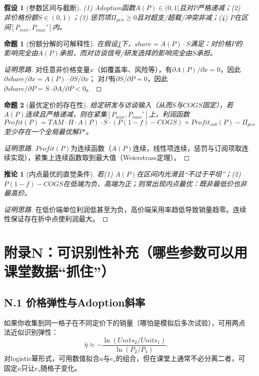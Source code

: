 \documentclass[UTF8,12pt]{ctexart}
\newtheorem{proposition}{命题}
\newtheorem{corollary}{推论}
\newtheorem{assumption}{假设}
\begin{document}
\begin{assumption}[参数区间与截断]\label{ass:param}
(1) Adoption函数$A(P)\in(0,1]$且对$P$严格递减；(2) 非价格份额$S\in(0,1)$；(3) 惩罚项$\Pi_{pen}\ge 0$且对超支/超载/冲突非减；(4) $P$在区间$[P_{min},P_{max}']$内。
\end{assumption}

\begin{proposition}[份额分解的可解释性]\label{prop:decomp}
在假设\ref{ass:param}下，$share=A(P)\cdot S$满足：对价格$P$的影响完全由$A(P)$承担，而对访谈信号/研发选择的影响完全由$S$承担。
\end{proposition}
\begin{proof}[证明思路]
对任意非价格变量$x$（如覆盖率、风险等），有$\partial A(P)/\partial x=0$，因此
$\partial share/\partial x=A(P)\cdot \partial S/\partial x$；
对$P$有$\partial S/\partial P=0$，因此$\partial share/\partial P=S\cdot \partial A/\partial P<0$。
\end{proof}

\begin{proposition}[最优定价的存在性]\label{prop:exist}
给定研发与访谈输入（从而$S$与$COGS$固定），若$A(P)$连续且严格递减，则在紧集$[P_{min},P_{max}']$上，利润函数
\[
Profit(P)=TAM\cdot H\cdot A(P)\cdot S\cdot (P(1-f)-COGS) + Profit_{sub}(P) - \Pi_{pen}
\]
至少存在一个全局最优解$P^\star$。
\end{proposition}
\begin{proof}[证明思路]
$Profit(P)$为连续函数（$A(P)$连续，线性项连续，惩罚与订阅项取连续实现），紧集上连续函数取到最大值（Weierstrass定理）。
\end{proof}

\begin{corollary}[内点最优的直觉条件]\label{cor:interior}
若(1) $A(P)$在区间内光滑且“不过于平坦”；(2) $P(1-f)-COGS$在低端为负、高端为正；则常出现内点最优：既非最低价也非最高价。
\end{corollary}
\begin{proof}[证明思路]
在低价端单位利润低甚至为负，高价端采用率趋低导致销量趋零。连续性保证存在折中点使利润最大。
\end{proof}

\section{附录N：可识别性补充（哪些参数可以用课堂数据“抓住”）}
\subsection{N.1 价格弹性与Adoption斜率}
如果你收集到同一格子在不同定价下的销量（哪怕是模拟后多次试验），可用两点法近似识别弹性：
\[
\widehat{\eta}\approx -\frac{\ln(Units_2/Units_1)}{\ln(P_2/P_1)}.
\]
对logistic幂形式，可用数值拟合$a$与$e_s$的组合，但在课堂上通常不必分离二者，可固定$a$只让$e_s$随格子变化。
\end{document}
